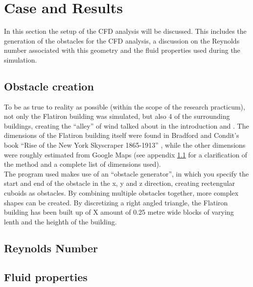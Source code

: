 \section{Case and Results}
\label{method}
In this section the setup of the CFD analysis will be discussed. This includes the generation of the obstacles for the CFD analysis, a discussion on the Reynolds number associated with this geometry and the fluid properties used during the simulation.
\subsection{Obstacle creation}
\label{obstacles}
To be as true to reality as possible (within the scope of the research practicum), not only the Flatiron building was simulated, but also 4 of the surrounding buildings, creating the ``alley'' of wind talked about in the introduction and \cite{dresses}. The dimensions of the Flatiron building itself were found in Bradford and Condit's book ``Rise of the New York Skyscraper 1865-1913'' \cite{skyscraper}, while the other dimensions were roughly estimated from Google Maps (see appendix \ref{obstacles} for a clarification of the method and a complete list of dimensions used). \\
\indent %
The program used makes use of an ``obstacle generator'', in which you specify the start and end of the obstacle in the x, y and z direction, creating rectengular cuboids as obstacles. By combining multiple obstacles together, more complex shapes can be created. By discretizing a right angled triangle, the Flatiron building has been built up of X amount of 0.25 metre wide blocks of varying lenth and the heighth of the building. 
\subsection{Reynolds Number}
\subsection{Fluid properties}